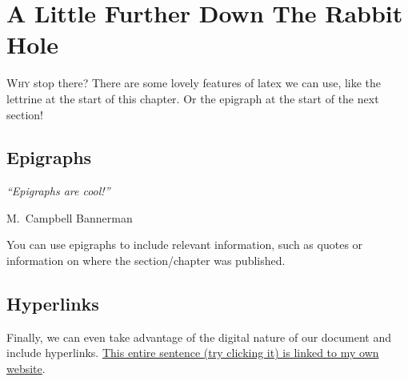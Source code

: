 \documentclass[12pt]{UoAThesis}
\begin{document}
\chapter{A Little Further Down The Rabbit Hole}
\lettrine{W}{hy} stop there? There are some lovely features of latex
we can use, like the lettrine at the start of this chapter. Or the
epigraph at the start of the next section!
\section{Epigraphs}
\epigraph{{\em ``Epigraphs are cool!''}}{M.~Campbell Bannerman}

You can use epigraphs to include relevant information, such as quotes
or information on where the section/chapter was published.

\section{Hyperlinks}
Finally, we can even take advantage of the digital nature of our
document and include
hyperlinks. \href{https://marcusbannerman.co.uk/images/stories/pdfs/thesis.pdf}{
  This entire sentence (try clicking it) is linked to my own website}.

\printbibliography[heading=thesisChapterBib]
\end{document}
